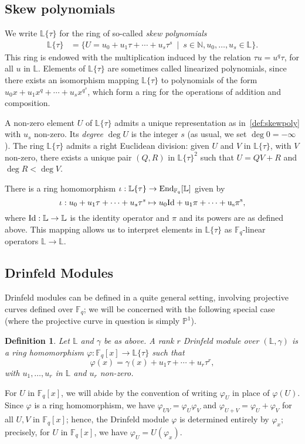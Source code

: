 \documentclass[sigconf]{acmart}
\newtheorem{definition}{Definition}
\renewcommand{\P}{\mathbb{P}}
\newcommand{\F}{\mathbb{F}}
\newcommand{\N}{\mathbb{N}}
\renewcommand{\L}{\mathbb{L}}
\newcommand{\ang}[1]{\{#1\}}
\begin{document}

\subsection{Skew polynomials}

We write $\L\ang{\tau}$ for the ring of so-called {\em skew
  polynomials}
\begin{align}\label{def:skewpoly}
\L\ang{\tau} &= \{U=u_0 + u_1 \tau + \cdots + u_s \tau^s \ \mid \ s \in
\N, u_0,\dots,u_s \in \L\}.
\end{align}
This ring is endowed with the multiplication induced by the relation
$\tau u = u^q \tau$, for all $u$ in $\L$.  Elements of $\L\ang{\tau}$
are sometimes called linearized polynomials, since there exists an
isomorphism mapping $\L\ang{\tau}$ to polynomials of the form $u_0x +
u_1 x^q + \cdots + u_s x^{q^s}$, which form a ring for the operations
of addition and composition. 

A non-zero element $U$ of $\L\ang{\tau}$ admits a unique
representation as in~\eqref{def:skewpoly} with $u_s$ non-zero. Its
{\em degree} $\deg U$ is the integer $s$ (as usual, we set $\deg 0
=-\infty$).  The ring $\L\ang{\tau}$ admits a right Euclidean
division: given $U$ and $V$ in $\L\ang{\tau}$, with $V$ non-zero,
there exists a unique pair $(Q,R)$ in $\L\ang{\tau}^2$ such that $U =
QV +R$ and $\deg R < \deg V$.

There is a ring homomorphism
$\iota:\L\ang{\tau} \to {\rm End}_{\F_q}[\L]$ given by
\[\iota: u_0 + u_1\tau + \dots
+ u_s\tau^s \mapsto u_0 \rm{Id} + u_1 \pi + \dots+ u_s \pi^s, \] where
$\rm{Id}: \L \to \L$ is the identity operator and $\pi$ and its powers
are as defined above. This mapping allows us to interpret elements in
$ \L\ang{\tau}$ as $\F_q$-linear operators $\L \to \L$.


\subsection{Drinfeld Modules}

Drinfeld modules can be defined in a quite general setting, involving
projective curves defined over $\F_q$; we will be concerned with
the following special case (where the projective curve in question
is simply $\P^1$).

\begin{definition}\label{def:Drinfeld}
  Let $\L$ and $\gamma$ be as above.  A rank $r$ {\em Drinfeld module}
  over $(\L,\gamma)$ is a ring homomorphism $\varphi: \F_q[x] \to
  \L\ang{\tau}$ such that
  \[\varphi(x) = \gamma(x) + u_1 \tau + \cdots + u_r\tau^r,\]
  with $u_1,\dots,u_r$ in $\L$ and $u_r$ non-zero.
\end{definition}
For $U$ in $\F_q[x]$, we will abide by the convention of writing
$\varphi_U$ in place of $\varphi(U)$. Since $\varphi$ is a ring
homomorphism, we have $\varphi_{UV} = \varphi_U \varphi_V$ and
$\varphi_{U+V} = \varphi_U+ \varphi_V$ for all $U,V$ in $\F_q[x]$;
hence, the Drinfeld module $\varphi$ is determined entirely by
$\varphi_x$; precisely, for $U$ in $\F_q[x]$, we have $\varphi_U =
U(\varphi_x)$.
\end{document}
